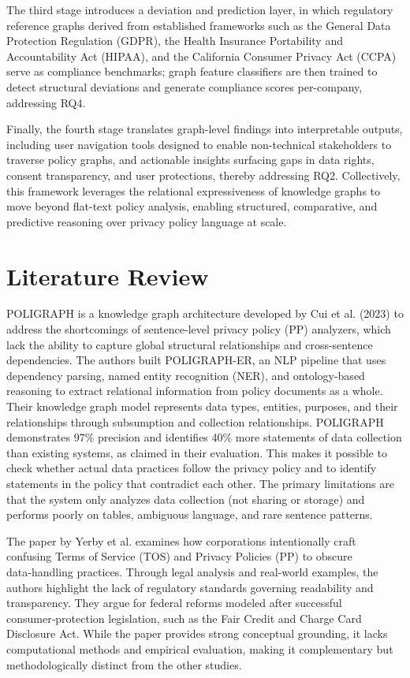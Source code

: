 \documentclass[conference]{IEEEtran}
\begin{document}
The third stage introduces a deviation and prediction layer, in which regulatory reference graphs derived from established frameworks such as the General Data Protection Regulation (GDPR), the Health Insurance Portability and Accountability Act (HIPAA), and the California Consumer Privacy Act (CCPA) serve as compliance benchmarks; graph feature classifiers are then trained to detect structural deviations and generate compliance scores per-company, addressing RQ4. 

Finally, the fourth stage translates graph-level findings into interpretable outputs, including user navigation tools designed to enable non-technical stakeholders to traverse policy graphs, and actionable insights surfacing gaps in data rights, consent transparency, and user protections, thereby addressing RQ2. Collectively, this framework leverages the relational expressiveness of knowledge graphs to move beyond flat-text policy analysis, enabling structured, comparative, and predictive reasoning over privacy policy language at scale.

\section{Literature Review}

POLIGRAPH \cite{cui2023} is a knowledge graph architecture developed by Cui et al. (2023) to address the shortcomings of sentence-level privacy policy (PP) analyzers, which lack the ability to capture global structural relationships and cross-sentence dependencies. The authors built POLIGRAPH-ER, an NLP pipeline that uses dependency parsing, named entity recognition (NER), and ontology-based reasoning to extract relational information from policy documents as a whole. Their knowledge graph model represents data types, entities, purposes, and their relationships through subsumption and collection relationships. POLIGRAPH demonstrates 97\% precision and identifies 40\% more statements of data collection than existing systems, as claimed in their evaluation. This makes it possible to check whether actual data practices follow the privacy policy and to identify statements in the policy that contradict each other. The primary limitations are that the system only analyzes data collection (not sharing or storage) and performs poorly on tables, ambiguous language, and rare sentence patterns.

The paper by Yerby et al. \cite{yerby2022} examines how corporations intentionally craft confusing Terms of Service (TOS) and Privacy Policies (PP) to obscure data‑handling practices. Through legal analysis and real‑world examples, the authors highlight the lack of regulatory standards governing readability and transparency. They argue for federal reforms modeled after successful consumer‑protection legislation, such as the Fair Credit and Charge Card Disclosure Act. While the paper provides strong conceptual grounding, it lacks computational methods and empirical evaluation, making it complementary but methodologically distinct from the other studies.
\end{document}
